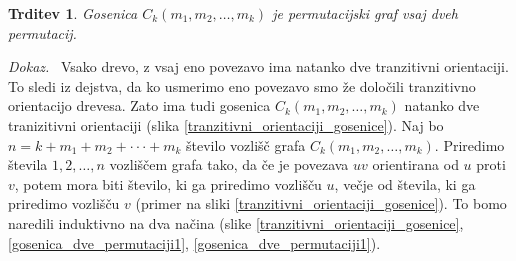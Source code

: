\documentclass[a4paper, 12pt]{book}
\newtheorem{trditev}{Trditev}[chapter]
\newenvironment{dokaz}{\emph{Dokaz.}\ }{\hspace{\fill}{$\Box$}}
\begin{document}
\begin{trditev}
\label{trditev_gosenica_vsaj_dve_permutaciji}
    Gosenica $C_k(m_1, m_2, \dots, m_k)$ je permutacijski graf vsaj dveh permutacij.
\end{trditev}
\begin{dokaz}
    Vsako drevo, z vsaj eno povezavo ima natanko dve tranzitivni orientaciji. To sledi iz dejstva, da ko usmerimo eno povezavo smo že določili tranzitivno orientacijo drevesa. Zato ima tudi gosenica $C_k(m_1, m_2, \dots, m_k)$ natanko dve tranizitivni orientaciji (slika \ref{tranzitivni_orientaciji_gosenice}).
    Naj bo $n = k + m_1 + m_2 + \cdot\cdot\cdot + m_k$ število vozlišč grafa $C_k(m_1, m_2, \dots, m_k)$. Priredimo števila $1, 2, \dots, n$ vozliščem grafa tako, da če je povezava $uv$ orientirana od $u$ proti $v$, potem mora biti število, ki ga priredimo vozlišču $u$, večje od števila, ki ga priredimo vozlišču $v$ (primer na sliki \ref{tranzitivni_orientaciji_gosenice}). To bomo naredili induktivno na dva načina (slike \ref{tranzitivni_orientaciji_gosenice}, \ref{gosenica_dve_permutaciji1}, \ref{gosenica_dve_permutaciji1}). 

    \begin{figure}[h]
        \begin{center}        
\end{center}
\end{figure}
\end{dokaz}
\end{document}
